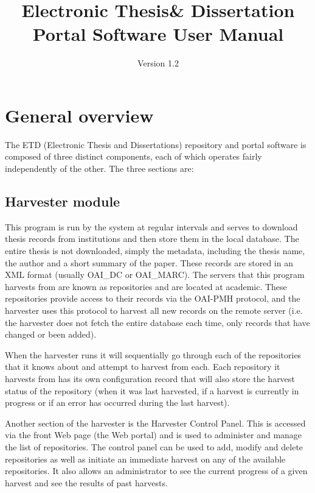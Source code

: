 \documentclass[a4paper,11pt]{article}
\title{Electronic Thesis\& Dissertation Portal Software User Manual}
\author{Version 1.2}
\begin{document}
\maketitle
\thispagestyle{empty}
\newpage
\tableofcontents
\thispagestyle{empty}
\newpage

\section{General overview}

The ETD (Electronic Thesis and Dissertations) repository and portal software is composed of three distinct components, each of which operates fairly independently of the other. The three sections are:

\subsection{Harvester module}

This program is run by the system at regular intervals and serves to download thesis records from institutions and then store them in the local database. The entire thesis is not downloaded, simply the metadata, including the thesis name, the author and a short summary of the paper. These records are stored in an XML format (usually OAI\_DC or OAI\_MARC). The servers that this program harvests from are known as repositories and are located at academic. These repositories provide access to their records via the OAI-PMH protocol, and the harvester uses this protocol to harvest all new records on the remote server (i.e. the harvester does not fetch the entire database each time, only records that have changed or been added).

When the harvester runs it will sequentially go through each of the repositories that it knows about and attempt to harvest from each. Each repository it harvests from has its own configuration record that will also store the harvest status of the repository (when it was last harvested, if a harvest is currently in progress or if an error has occurred during the last harvest).

Another section of the harvester is the Harvester Control Panel. This is accessed via the front Web page (the Web portal) and is used to administer and manage the list of repositories. The control panel can be used to add, modify and delete repositories as well as initiate an immediate harvest on any of the available repositories. It also allows an administrator to see the current progress of a given harvest and see the results of past harvests.
\end{document}
